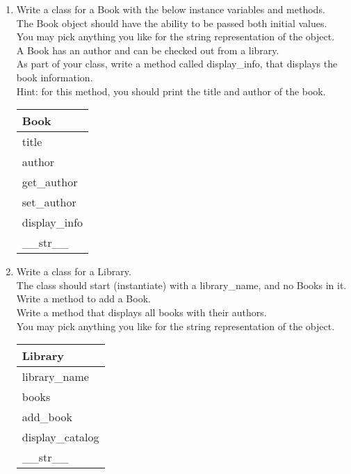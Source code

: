 \pagebreak



	\item
	\begin{enumerate}
		\item
			Write a class for a Book with the below instance variables and methods.\\ 
			The Book object should have the ability to be passed both initial values.\\  
			You may pick anything you like for the string representation of the object.\\
			A Book has an author and can be checked out from a library.\\  
			As part of your class, write a method called display\_info, that displays the book information.\\
			Hint: for this method, you should print the title and author of the book.
			\begin{flushright}
			\begin{tabular}{|l|}
				\hline
				Book\\ \hline
				title \\	author\\	 \hline
				get\_author \\ set\_author \\ display\_info \\ \_\_str\_\_ \\ \hline
			\end{tabular}
			\end{flushright}

		\item
			Write a class for a Library. \\
			The class should start (instantiate) with a library\_name, and no Books in it. \\ 
			Write a method to add a Book.\\
			Write a method that displays all books with their authors.\\
			You may pick anything you like for the string representation of the object.
	
			\begin{flushright}
			\begin{tabular}{|l|}
				\hline
				Library\\ \hline  	%
				library\_name \\ books\\ \hline		%
				add\_book \\ display\_catalog \\ \_\_str\_\_ \\ \hline		%
			\end{tabular}
			\end{flushright}


\end{enumerate}
